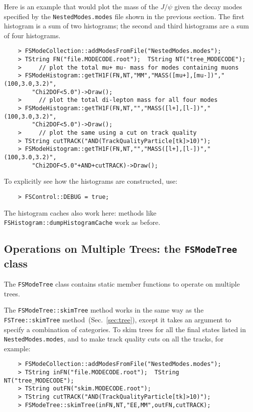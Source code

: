\documentclass[11pt]{article}
\begin{document}
Here is an example that would plot the mass of the $J/\psi$ given the decay modes specified by the {\tt NestedModes.modes} file shown in the previous section.  The first histogram is a sum of two histograms; the second and third histograms are a sum of four histograms.
\begin{verbatim}
    > FSModeCollection::addModesFromFile("NestedModes.modes");
    > TString FN("file.MODECODE.root");  TString NT("tree_MODECODE");
    >     // plot the total mu+ mu- mass for modes containing muons  
    > FSModeHistogram::getTH1F(FN,NT,"MM","MASS([mu+],[mu-])","(100,3.0,3.2)",
        "Chi2DOF<5.0")->Draw();
    >     // plot the total di-lepton mass for all four modes  
    > FSModeHistogram::getTH1F(FN,NT,"","MASS([l+],[l-])","(100,3.0,3.2)",
        "Chi2DOF<5.0")->Draw();
    >     // plot the same using a cut on track quality
    > TString cutTRACK("AND(TrackQualityParticle[tk]>10)");
    > FSModeHistogram::getTH1F(FN,NT,"","MASS([l+],[l-])","(100,3.0,3.2)",
        "Chi2DOF<5.0"+AND+cutTRACK)->Draw();
\end{verbatim}

To explicitly see how the histograms are constructed, use:
\begin{verbatim}
    > FSControl::DEBUG = true;
\end{verbatim}

The histogram caches also work here:  methods like {\tt FSHistogram::dumpHistogramCache} work as before.


\subsection{Operations on Multiple Trees: the {\tt FSModeTree} class}
\label{sec:modetree}

The {\tt FSModeTree} class contains static member functions to operate on multiple trees.

The {\tt FSModeTree::skimTree} method works in the same way as the {\tt FSTree::skimTree} method~(Sec.~\ref{sec:tree}), except it takes an argument to specify a combination of categories.  To skim trees for all the final states listed in {\tt NestedModes.modes}, and to make track quality cuts on all the tracks, for example:
\begin{verbatim}
    > FSModeCollection::addModesFromFile("NestedModes.modes");
    > TString inFN("file.MODECODE.root");  TString NT("tree_MODECODE");
    > TString outFN("skim.MODECODE.root");
    > TString cutTRACK("AND(TrackQualityParticle[tk]>10)");
    > FSModeTree::skimTree(inFN,NT,"EE,MM",outFN,cutTRACK);
\end{verbatim}
\end{document}
